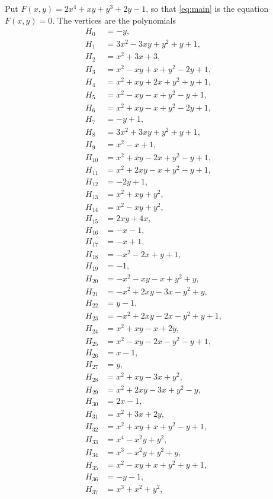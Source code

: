 \documentclass[11pt]{article}
\begin{document}
Put $F(x,y)=2x^{4}+xy+y^{3}+2y-1$, so that \eqref{eq:main} is the equation $F(x,y)=0$. The vertices are the polynomials
\begin{align*}
H_{0}&=-y,\\
H_{1}&=3x^{2}-3xy+y^{2}+y+1,\\
H_{2}&=x^{2}+3x+3,\\
H_{3}&=x^{2}-xy+x+y^{2}-2y+1,\\
H_{4}&=x^{2}+xy+2x+y^{2}+y+1,\\
H_{5}&=x^{2}-xy-x+y^{2}-y+1,\\
H_{6}&=x^{2}+xy-x+y^{2}-2y+1,\\
H_{7}&=-y+1,\\
H_{8}&=3x^{2}+3xy+y^{2}+y+1,\\
H_{9}&=x^{2}-x+1,\\
H_{10}&=x^{2}+xy-2x+y^{2}-y+1,\\
H_{11}&=x^{2}+2xy-x+y^{2}-y+1,\\
H_{12}&=-2y+1,\\
H_{13}&=x^{2}+xy+y^{2},\\
H_{14}&=x^{2}-xy+y^{2},\\
H_{15}&=2xy+4x,\\
H_{16}&=-x-1,\\
H_{17}&=-x+1,\\
H_{18}&=-x^{2}-2x+y+1,\\
H_{19}&=-1,\\
H_{20}&=-x^{2}-xy-x+y^{2}+y,\\
H_{21}&=-x^{2}+2xy-3x-y^{2}+y,\\
H_{22}&=y-1,\\
H_{23}&=-x^{2}+2xy-2x-y^{2}+y+1,\\
H_{24}&=x^{2}+xy-x+2y,\\
H_{25}&=x^{2}-xy-2x-y^{2}-y+1,\\
H_{26}&=x-1,\\
H_{27}&=y,\\
H_{28}&=x^{2}+xy-3x+y^{2},\\
H_{29}&=x^{2}+2xy-3x+y^{2}-y,\\
H_{30}&=2x-1,\\
H_{31}&=x^{2}+3x+2y,\\
H_{32}&=x^{2}+xy+x+y^{2}-y+1,\\
H_{33}&=x^{4}-x^{2}y+y^{2},\\
H_{34}&=x^{3}-x^{2}y+y^{2}+y,\\
H_{35}&=x^{2}-xy+x+y^{2}+y+1,\\
H_{36}&=-y-1,\\
H_{37}&=x^{3}+x^{2}+y^{2},\\

\end{align*}
\end{document}
